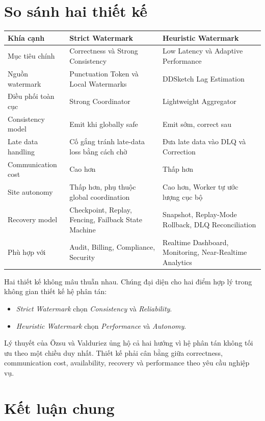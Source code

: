 \documentclass[12pt,a4paper]{article}
\begin{document}
\section{So sánh hai thiết kế}

\begin{longtable}{p{} p{} p{}}
\toprule
\textbf{Khía cạnh} & \textbf{Strict Watermark} & \textbf{Heuristic Watermark} \\
\midrule
\endhead
Mục tiêu chính & Correctness và Strong Consistency & Low Latency và Adaptive Performance \\
Nguồn watermark & Punctuation Token và Local Watermarks & DDSketch Lag Estimation \\
Điều phối toàn cục & Strong Coordinator & Lightweight Aggregator \\
Consistency model & Emit khi globally safe & Emit sớm, correct sau \\
Late data handling & Cố gắng tránh late-data loss bằng cách chờ & Đưa late data vào DLQ và Correction \\
Communication cost & Cao hơn & Thấp hơn \\
Site autonomy & Thấp hơn, phụ thuộc global coordination & Cao hơn, Worker tự ước lượng cục bộ \\
Recovery model & Checkpoint, Replay, Fencing, Failback State Machine & Snapshot, Replay-Mode Rollback, DLQ Reconciliation \\
Phù hợp với & Audit, Billing, Compliance, Security & Realtime Dashboard, Monitoring, Near-Realtime Analytics \\
\bottomrule
\end{longtable}

Hai thiết kế không mâu thuẫn nhau. Chúng đại diện cho hai điểm hợp lý trong không gian thiết kế hệ phân tán:

\begin{itemize}
    \item \textit{Strict Watermark} chọn \textit{Consistency} và \textit{Reliability}.
    \item \textit{Heuristic Watermark} chọn \textit{Performance} và \textit{Autonomy}.
\end{itemize}

Lý thuyết của Özsu và Valduriez ủng hộ cả hai hướng vì hệ phân tán không tối ưu theo một chiều duy nhất. Thiết kế phải cân bằng giữa correctness, communication cost, availability, recovery và performance theo yêu cầu nghiệp vụ.

\section{Kết luận chung}
\end{document}
